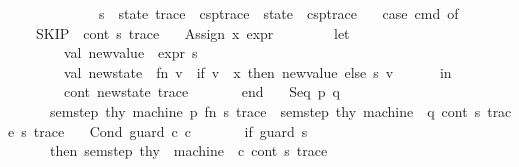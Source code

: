 \begin{isabellebody}
\ \ \ \ \ \ \ \ \ \ \ \ \ {\isacharparenleft}{\kern0pt}s\ {\isacharcolon}{\kern0pt}\ state{\isacharcomma}{\kern0pt}\ trace\ {\isacharcolon}{\kern0pt}\ csp{\isacharunderscore}{\kern0pt}trace{\isacharparenright}{\kern0pt}\ {\isacharcolon}{\kern0pt}\ state\ {\isacharasterisk}{\kern0pt}\ csp{\isacharunderscore}{\kern0pt}trace\ {\isacharequal}{\kern0pt}\isanewline
\ \ case\ cmd\ of\isanewline
\ \ \ \ SKIP\ {\isacharequal}{\kern0pt}{\isachargreater}{\kern0pt}\ cont\ {\isacharparenleft}{\kern0pt}s{\isacharcomma}{\kern0pt}\ trace{\isacharparenright}{\kern0pt}\isanewline
\ \ {\isacharbar}{\kern0pt}\ Assign\ {\isacharparenleft}{\kern0pt}x{\isacharcomma}{\kern0pt}\ expr{\isacharparenright}{\kern0pt}\ {\isacharequal}{\kern0pt}{\isachargreater}{\kern0pt}\ \isanewline
\ \ \ \ \ \ let\ \isanewline
\ \ \ \ \ \ \ \ val\ new{\isacharunderscore}{\kern0pt}value\ {\isacharequal}{\kern0pt}\ expr\ s\isanewline
\ \ \ \ \ \ \ \ val\ new{\isacharunderscore}{\kern0pt}state\ {\isacharequal}{\kern0pt}\ fn\ v\ {\isacharequal}{\kern0pt}{\isachargreater}{\kern0pt}\ if\ v\ {\isacharequal}{\kern0pt}\ x\ then\ new{\isacharunderscore}{\kern0pt}value\ else\ s\ v\isanewline
\ \ \ \ \ \ in\ \isanewline
\ \ \ \ \ \ \ \ cont\ {\isacharparenleft}{\kern0pt}new{\isacharunderscore}{\kern0pt}state{\isacharcomma}{\kern0pt}\ trace{\isacharparenright}{\kern0pt}\ \isanewline
\ \ \ \ \ \ end\isanewline
\ \ {\isacharbar}{\kern0pt}\ Seq\ {\isacharparenleft}{\kern0pt}p{\isacharcomma}{\kern0pt}\ q{\isacharparenright}{\kern0pt}\ {\isacharequal}{\kern0pt}{\isachargreater}{\kern0pt}\ \isanewline
\ \ \ \ \ \ sem{\isacharunderscore}{\kern0pt}step\ thy\ machine\ p\ {\isacharparenleft}{\kern0pt}fn\ {\isacharparenleft}{\kern0pt}s{\isacharprime}{\kern0pt}{\isacharcomma}{\kern0pt}\ trace{\isacharprime}{\kern0pt}{\isacharparenright}{\kern0pt}\ {\isacharequal}{\kern0pt}{\isachargreater}{\kern0pt}\ sem{\isacharunderscore}{\kern0pt}step\ thy\ machine\ \ q\ cont\ {\isacharparenleft}{\kern0pt}s{\isacharprime}{\kern0pt}{\isacharcomma}{\kern0pt}\ trace{\isacharprime}{\kern0pt}{\isacharparenright}{\kern0pt}{\isacharparenright}{\kern0pt}\ {\isacharparenleft}{\kern0pt}s{\isacharcomma}{\kern0pt}\ trace{\isacharparenright}{\kern0pt}\isanewline
\ \ {\isacharbar}{\kern0pt}\ Cond\ {\isacharparenleft}{\kern0pt}guard{\isacharcomma}{\kern0pt}\ c{}{\isacharcomma}{\kern0pt}\ c{}{\isacharparenright}{\kern0pt}\ {\isacharequal}{\kern0pt}{\isachargreater}{\kern0pt}\isanewline
\ \ \ \ \ \ if\ guard\ s\ \isanewline
\ \ \ \ \ \ then\ sem{\isacharunderscore}{\kern0pt}step\ thy\ \ machine\ \ c{}\ cont\ {\isacharparenleft}{\kern0pt}s{\isacharcomma}{\kern0pt}\ trace{\isacharparenright}{\kern0pt}\isanewline

\end{isabellebody}
